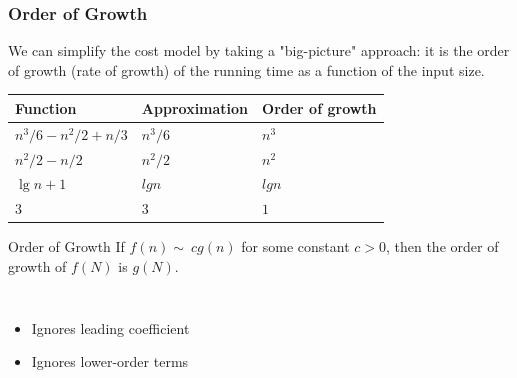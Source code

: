 \documentclass[aspectratio=169, 14pt]{beamer}
\begin{document}
\begin{frame}[fragile]
	\frametitle{Order of Growth}
	We can simplify the cost model by taking a "big-picture" approach: it is the \alert{order of growth} (rate of growth) of the running time as a function of the input size.

	\begin{table}
		\begin{tabular}{lll}
			\toprule
			Function              & Approximation & Order of growth \\
			\midrule
			$n^3/6 - n^2/2 + n/3$ & $n^3/6$       & $n^3$           \\
			$n^2/2 - n/2$         & $n^2/2$       & $n^2$           \\
			$\lg{n} + 1$          & $lg{n}$       & $lg{n}$         \\
			$3$                   & $3$           & $1$             \\
			\bottomrule
		\end{tabular}
	\end{table}
\end{frame}

\begin{frame}[fragile]
	\begin{exampleblock}{Order of Growth}
		If $f(n)\sim\ cg(n)$ for some constant $c > 0$, then \alert{the order of growth} of $f(N)$ is $g(N)$.
	\end{exampleblock}

	\begin{columns}
		\begin{itemize}
			\item Ignores leading coefficient
			\item Ignores lower-order terms
		\end{itemize}
	\end{columns}
\end{frame}
\end{document}
